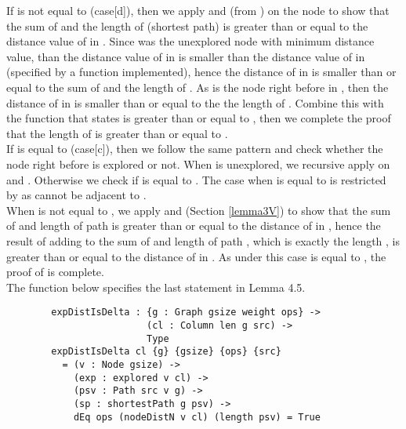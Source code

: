 If  is not equal to (case[d]), then we apply  and (from ) on the node  to show that the sum of  and the length of  (shortest  path) is greater than or equal to the distance value of  in . Since  was the unexplored node with minimum distance value, than the distance value of  in  is smaller than the distance value of  in (specified by a  function implemented), hence the distance of  in  is smaller than or equal to the sum of  and the length of . As  is the node right before  in , then the distance of  in  is smaller than or equal to the the length of . Combine this with the function  that states  is greater than or equal to , then we complete the proof that the length of  is greater than or equal to . 
\\

If  is equal to (case[c]), then we follow the same pattern and check whether the node  right before  is explored or not. When  is unexplored, we recursive apply  on  and . Otherwise we check if  is equal to . The case when  is equal to  is restricted by  as  cannot be adjacent to . 
\\

When  is not equal to , we apply  and  (Section \ref{lemma3V}) to show that the sum of  and length of path  is greater than or equal to the distance of  in , hence the result of adding  to the sum of  and length of path , which is exactly the length , is greater than or equal to the distance of  in . As under this case  is equal to , the proof of  is complete. 
\\

The function  below specifies the last statement in Lemma 4.5. 
\begin{lstlisting}
		expDistIsDelta : {g : Graph gsize weight ops} ->
		                 (cl : Column len g src) ->
		                 Type
		expDistIsDelta cl {g} {gsize} {ops} {src}
		  = (v : Node gsize) ->
		    (exp : explored v cl) ->
		    (psv : Path src v g) ->
		    (sp : shortestPath g psv) ->
		    dEq ops (nodeDistN v cl) (length psv) = True
\end{lstlisting}

